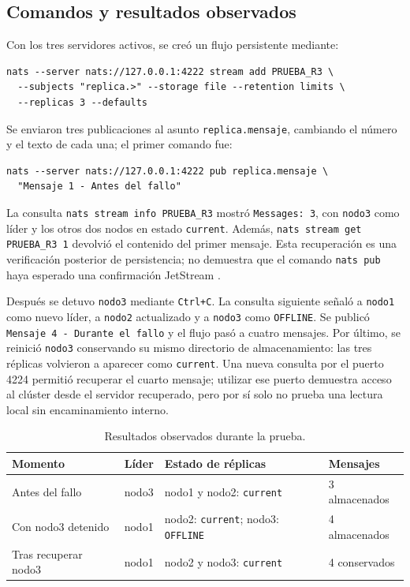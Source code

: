 \documentclass[12pt,a4paper]{article}
\begin{document}
\subsection{Comandos y resultados observados}
Con los tres servidores activos, se creó un flujo persistente mediante:
\begin{verbatim}
nats --server nats://127.0.0.1:4222 stream add PRUEBA_R3 \
  --subjects "replica.>" --storage file --retention limits \
  --replicas 3 --defaults
\end{verbatim}
Se enviaron tres publicaciones al asunto \texttt{replica.mensaje}, cambiando el número y el texto de cada una; el primer comando fue:
\begin{verbatim}
nats --server nats://127.0.0.1:4222 pub replica.mensaje \
  "Mensaje 1 - Antes del fallo"
\end{verbatim}
La consulta \texttt{nats stream info PRUEBA\_R3} mostró \texttt{Messages: 3}, con \texttt{nodo3} como líder y los otros dos nodos en estado \texttt{current}. Además, \texttt{nats stream get PRUEBA\_R3 1} devolvió el contenido del primer mensaje. Esta recuperación es una verificación posterior de persistencia; no demuestra que el comando \texttt{nats pub} haya esperado una confirmación JetStream \cite{natsjetstream}.

Después se detuvo \texttt{nodo3} mediante \texttt{Ctrl+C}. La consulta siguiente señaló a \texttt{nodo1} como nuevo líder, a \texttt{nodo2} actualizado y a \texttt{nodo3} como \texttt{OFFLINE}. Se publicó \texttt{Mensaje 4 - Durante el fallo} y el flujo pasó a cuatro mensajes. Por último, se reinició \texttt{nodo3} conservando su mismo directorio de almacenamiento: las tres réplicas volvieron a aparecer como \texttt{current}. Una nueva consulta por el puerto 4224 permitió recuperar el cuarto mensaje; utilizar ese puerto demuestra acceso al clúster desde el servidor recuperado, pero por sí solo no prueba una lectura local sin encaminamiento interno.

\begin{table}[H]
\centering\small
\caption{Resultados observados durante la prueba.}
\label{tab:ensayo}
\begin{tabular}{@{}p{3.1cm}p{3.2cm}p{3.6cm}p{3.5cm}@{}}
\toprule
\textbf{Momento} & \textbf{Líder} & \textbf{Estado de réplicas} & \textbf{Mensajes} \\\midrule
Antes del fallo & nodo3 & nodo1 y nodo2: \texttt{current} & 3 almacenados \\
Con nodo3 detenido & nodo1 & nodo2: \texttt{current}; nodo3: \texttt{OFFLINE} & 4 almacenados \\
Tras recuperar nodo3 & nodo1 & nodo2 y nodo3: \texttt{current} & 4 conservados \\\bottomrule
\end{tabular}
\end{table}
\end{document}
